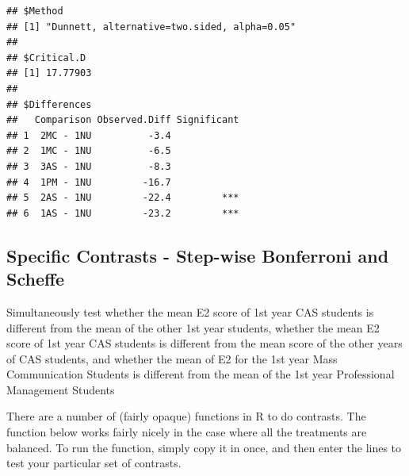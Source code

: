 \documentclass[
]{book}
\begin{document}
\begin{verbatim}
## $Method
## [1] "Dunnett, alternative=two.sided, alpha=0.05"
## 
## $Critical.D
## [1] 17.77903
## 
## $Differences
##   Comparison Observed.Diff Significant
## 1  2MC - 1NU          -3.4            
## 2  1MC - 1NU          -6.5            
## 3  3AS - 1NU          -8.3            
## 4  1PM - 1NU         -16.7            
## 5  2AS - 1NU         -22.4         ***
## 6  1AS - 1NU         -23.2         ***
\end{verbatim}

\hypertarget{specific-contrasts---step-wise-bonferroni-and-scheffe}{%
\subsection{Specific Contrasts - Step-wise Bonferroni and Scheffe}\label{specific-contrasts---step-wise-bonferroni-and-scheffe}}

Simultaneously test whether the mean E2 score of 1st year CAS students is different from the mean of the other 1st year students, whether the mean E2 score of 1st year CAS students is different from the mean score of the other years of CAS students, and whether the mean of E2 for the 1st year Mass Communication Students is different from the mean of the 1st year Professional Management Students

There are a number of (fairly opaque) functions in R to do contrasts. The function below works fairly nicely in the case where all the treatments are balanced. To run the function, simply copy it in once, and then enter the lines to test your particular set of contrasts.
\end{document}
